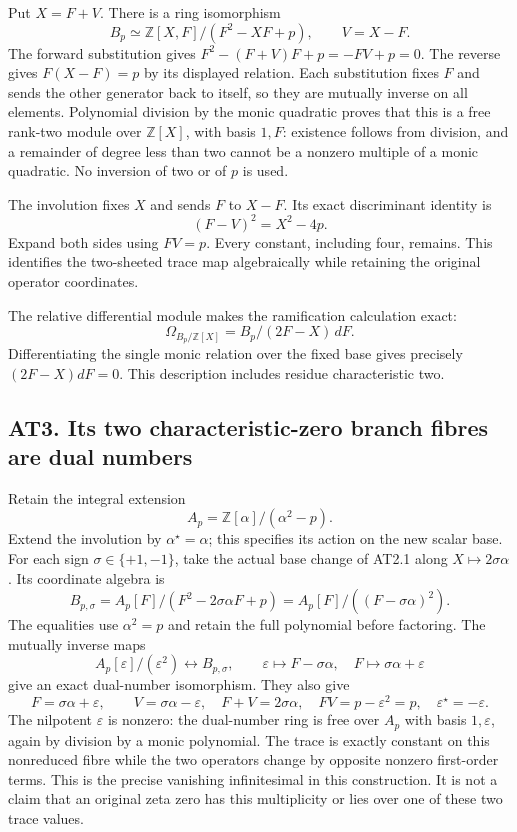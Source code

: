\documentclass[
]{article}
\begin{document}
Put \(X=F+V\). There is a ring isomorphism \[
\boxed{B_p\simeq\mathbb Z[X,F]/(F^2-XF+p),\qquad V=X-F.}
\tag{AT2.1}
\] The forward substitution gives \(F^2-(F+V)F+p=-FV+p=0\). The reverse
gives \(F(X-F)=p\) by its displayed relation. Each substitution fixes
\(F\) and sends the other generator back to itself, so they are mutually
inverse on all elements. Polynomial division by the monic quadratic
proves that this is a free rank-two module over \(\mathbb Z[X]\), with
basis \(1,F\): existence follows from division, and a remainder of
degree less than two cannot be a nonzero multiple of a monic quadratic.
No inversion of two or of \(p\) is used.

The involution fixes \(X\) and sends \(F\) to \(X-F\). Its exact
discriminant identity is \[
\boxed{(F-V)^2=X^2-4p.}
\tag{AT2.2}
\] Expand both sides using \(FV=p\). Every constant, including four,
remains. This identifies the two-sheeted trace map algebraically while
retaining the original operator coordinates.

The relative differential module makes the ramification calculation
exact: \[
\Omega_{B_p/\mathbb Z[X]}=B_p/(2F-X)\,dF.
\tag{AT2.3}
\] Differentiating the single monic relation over the fixed base gives
precisely \((2F-X)dF=0\). This description includes residue
characteristic two.

\subsection{AT3. Its two characteristic-zero branch fibres are dual
numbers}\label{at3.-its-two-characteristic-zero-branch-fibres-are-dual-numbers}

Retain the integral extension \[
A_p=\mathbb Z[\alpha]/(\alpha^2-p).
\tag{AT3.1}
\] Extend the involution by \(\alpha^\star=\alpha\); this specifies its
action on the new scalar base. For each sign \(\sigma\in\{+1,-1\}\),
take the actual base change of AT2.1 along \(X\mapsto2\sigma\alpha\).
Its coordinate algebra is \[
B_{p,\sigma}=A_p[F]/(F^2-2\sigma\alpha F+p)
=A_p[F]/((F-\sigma\alpha)^2).
\tag{AT3.2}
\] The equalities use \(\alpha^2=p\) and retain the full polynomial
before factoring. The mutually inverse maps \[
\boxed{A_p[\varepsilon]/(\varepsilon^2)\longleftrightarrow B_{p,\sigma},
\qquad \varepsilon\longmapsto F-\sigma\alpha,\quad
F\longmapsto\sigma\alpha+\varepsilon}
\tag{AT3.3}
\] give an exact dual-number isomorphism. They also give \[
F=\sigma\alpha+\varepsilon,\qquad
V=\sigma\alpha-\varepsilon,
\quad F+V=2\sigma\alpha,
\quad FV=p-\varepsilon^2=p,
\quad\varepsilon^\star=-\varepsilon.
\tag{AT3.4}
\] The nilpotent \(\varepsilon\) is nonzero: the dual-number ring is
free over \(A_p\) with basis \(1,\varepsilon\), again by division by a
monic polynomial. The trace is exactly constant on this nonreduced fibre
while the two operators change by opposite nonzero first-order terms.
This is the precise vanishing infinitesimal in this construction. It is
not a claim that an original zeta zero has this multiplicity or lies
over one of these two trace values.
\end{document}
